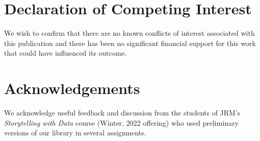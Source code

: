 \documentclass[preprint,12pt, a4paper]{elsarticle}
\begin{document}
\section*{Declaration of Competing Interest}
We wish to confirm that there are no known conflicts of interest associated with this publication and there has been no significant financial support for this work that could have influenced its outcome.


\section*{Acknowledgements}
We acknowledge useful feedback and discussion from the students of
JRM's \textit{Storytelling with Data} course (Winter, 2022 offering)
who used preliminary versions of our library in several assignments.



\end{document}
